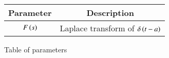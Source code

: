 \renewcommand\thetable{1}
\begin{tabular}{|c|c|}
    \hline 
    \textbf{Parameter}&\textbf{Description} \\
    \hline
    $F\left(s\right)$ & Laplace transform of $\delta\left(t - a\right)$ \\
    \hline
\end{tabular}

\caption{Table of parameters}
\label{Table:2022.ME.3.1}

